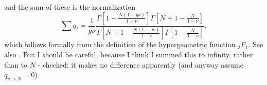 and the sum of these is the normalization
\begin{equation*}
\sum q_i = \frac{1}{g\nu} \frac{\Gamma[1-\frac{N(1-g\nu)}{1-\nu}]\Gamma[N+1-\frac{N}{1-\nu}]}{\Gamma[N+1-\frac{N(1-g\nu)}{1-\nu}]\Gamma[1-\frac{N}{1-\nu}]},
\end{equation*}
which follows formally from the definition of the hypergeometric function $_2F_1$. 
See also \cite{McKane2003}. 
\iffalse%
But I should be careful, because I think I summed this to infinity, rather than to $N$ - checked; it makes no difference apparently (and anyway assume $q_{n>N}=0$). \\
